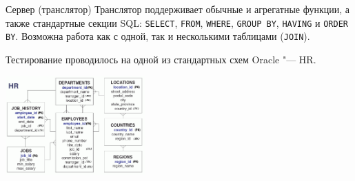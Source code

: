 \begin{frame}[fragile]{Сервер (транслятор)}%
  Транслятор поддерживает обычные и агрегатные функции, а также стандартные секции SQL:
  \texttt{SELECT}, \texttt{FROM}, \texttt{WHERE}, \texttt{GROUP BY}, \texttt{HAVING} и \texttt{ORDER BY}.
  Возможна работа как с одной, так и несколькими таблицами (\texttt{JOIN}).

  Тестирование проводилось на одной из стандартных схем Oracle "--- HR.
  \begin{center}%
    \includegraphics[width=0.4\textwidth]{img/scheme.png}
  \end{center}

\end{frame}
